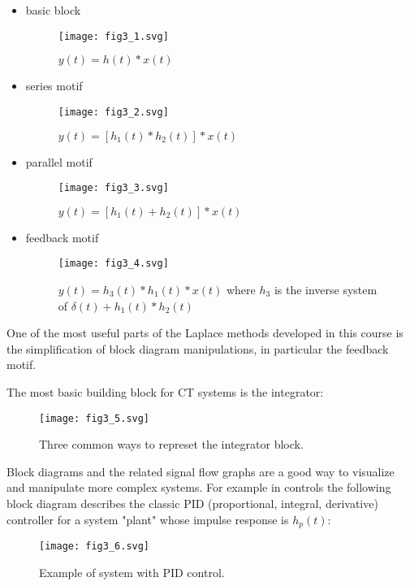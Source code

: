 \documentclass{article}
\begin{document}
\begin{itemize}
\item basic block
    \begin{figure}
    \centering
    \texttt{[image: fig3\_1.svg]}
    \caption{$y(t) = h(t)*x(t)$}
  \end{figure}
  \item series motif
    \begin{figure}
    \centering
    \texttt{[image: fig3\_2.svg]}
    \caption{$y(t) = [h_1(t)*h_2(t)]*x(t)$}
    \end{figure}
  \item parallel motif
    \begin{figure}
    \centering
    \texttt{[image: fig3\_3.svg]}
    \caption{$y(t) = [h_1(t) + h_2(t)]*x(t)$}
    \end{figure}
  \item feedback motif
    \begin{figure}
      \centering
    \texttt{[image: fig3\_4.svg]}
    \caption{$y(t) = h_3(t)*h_1(t)*x(t)$ where $h_3$ is the inverse system of $\delta(t) + h_1(t)*h_2(t)$}
    \end{figure}
\end{itemize}

One of the most useful parts of the Laplace methods developed in this course is the simplification of block diagram manipulations, in particular the feedback motif.

The most basic building block for CT systems is the integrator:

\begin{figure}
  \centering
  \texttt{[image: fig3\_5.svg]}
  \caption{Three common ways to represet the integrator block.}
\end{figure}
    
Block diagrams and the related signal flow graphs are a good way to visualize and manipulate more complex systems. For example in controls the following block diagram describes the classic PID (proportional, integral, derivative) controller for a system "plant" whose impulse response is $h_p(t)$:

\begin{figure}
  \centering
  \texttt{[image: fig3\_6.svg]}
  \caption{Example of system with PID control.}
\end{figure}
\end{document}

